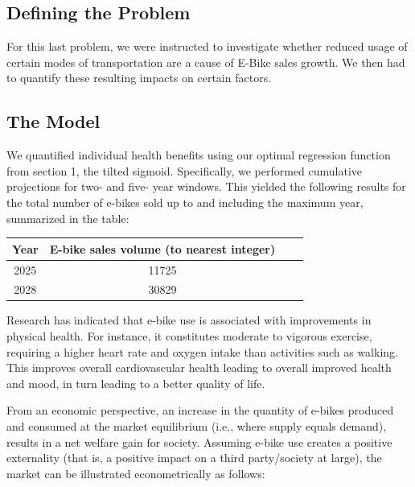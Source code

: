 \subsection{Defining the Problem}
For this last problem, we were instructed to investigate whether reduced usage of certain modes of transportation are a cause of E-Bike sales growth. We then had to quantify these resulting impacts on certain factors.

\subsection{The Model}
We quantified individual health benefits using our optimal regression function from section 1, the tilted sigmoid. Specifically, we performed cumulative projections for two- and five- year windows. This yielded the following results for the total number of e-bikes sold up to and including the maximum year, summarized in the table:

\begin{center}
    \begin{tabular}{ |c|c|c|c|}
        \hline
        \textbf{Year}  & \textbf{E-bike sales volume (to nearest integer)}\\
        \hline
        2025 & 11725\\
        \hline
        2028 & 30829\\
        \hline
    \end{tabular}
\end{center}

Research has indicated that e-bike use is associated with improvements in physical health. For instance, it constitutes moderate to vigorous exercise, requiring a higher heart rate and oxygen intake than activities such as walking. This improves overall cardiovascular health leading to overall improved health and mood, in turn leading to a better quality of life.

From an economic perspective, an increase in the quantity of e-bikes produced and consumed at the market equilibrium (i.e., where supply equals demand), results in a net welfare gain for society. Assuming e-bike use creates a positive externality (that is, a positive impact on a third party/society at large), the market can be illustrated econometrically as follows:

